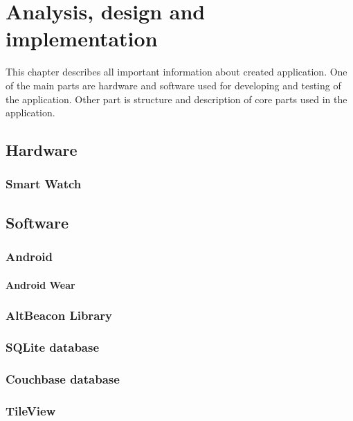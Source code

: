 \chapter{Analysis, design and implementation}\label{sec:AnalysisDesignAndImplementation}
This chapter describes all important information about created application. One of the main parts are hardware and software used for developing and testing of the application. Other part is structure and description of core parts used in the application. 

\section{Hardware}
\label{sec:Hardware}

\subsection{Smart Watch}
\label{subsec:SmartWatch}

\section{Software}
\label{sec:Software}

\subsection{Android}
\label{subsec:Android}

\subsubsection{Android Wear}
\label{subsec:AndroidWear}

\subsection{AltBeacon Library}
\label{subsec:AltBeaconLibrary}

\subsection{SQLite database}
\label{subsec:SQLiteDatabase}

\subsection{Couchbase database}
\label{subsec:CouchbaseDatabase}

\subsection{TileView}
\label{subsec:TileView}


